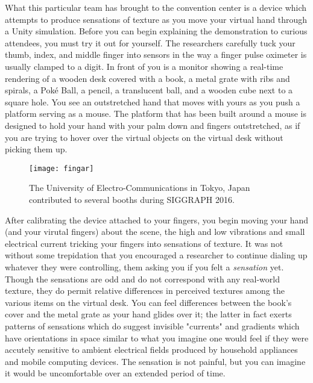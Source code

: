 \documentclass[../main.tex]{subfiles}
\begin{document}
What this particular team has brought to the convention center is a device which attempts to produce sensations of texture as you move your virtual hand through a Unity simulation. Before you can begin explaining the demonstration to curious attendees, you must try it out for yourself. The researchers carefully tuck your thumb, index, and middle finger into sensors in the way a finger pulse oximeter is usually clamped to a digit. In front of you is a monitor showing a real-time rendering of a wooden desk covered with a book, a metal grate with ribs and spirals, a Poké Ball, a pencil, a translucent ball, and a wooden cube next to a square hole. You see an outstretched hand that moves with yours as you push a platform serving as a mouse. The platform that has been built around a mouse is designed to hold your hand with your palm down and fingers outstretched, as if you are trying to hover over the virtual objects on the virtual desk without picking them up.

\begin{figure}[h!]
	\centering
	\texttt{[image: fingar]}
	\caption*{The University of Electro-Communications in Tokyo, Japan contributed to several booths during SIGGRAPH 2016.}
\end{figure}

After calibrating the device attached to your fingers, you begin moving your hand (and your virutal fingers) about the scene, the high and low vibrations and small electrical current tricking your fingers into sensations of texture. It was not without some trepidation that you encouraged a researcher to continue dialing up whatever they were controlling, them asking you if you felt a \textit{sensation} yet. Though the sensations are odd and do not correspond with any real-world texture, they do permit relative differences in perceived textures among the various items on the virtual desk. You can feel differences between the book's cover and the metal grate as your hand glides over it; the latter in fact exerts patterns of sensations which do suggest invisible "currents" and gradients which have orientations in space similar to what you imagine one would feel if they were accutely sensitive to ambient electrical fields produced by household appliances and mobile computing devices. The sensation is not painful, but you can imagine it would be uncomfortable over an extended period of time.
\end{document}
